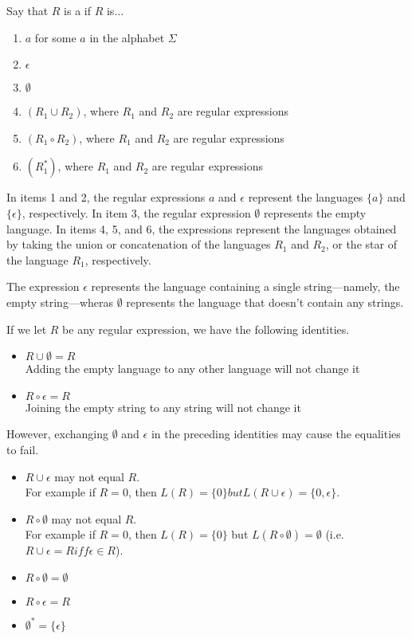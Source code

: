 \documentclass{article}
\begin{document}
\begin{definition}
  Say that $R$ is a  if $R$ is$\dots$ 
  \begin{enumerate}
    \item $a$ for some $a$ in the alphabet $\Sigma$ 
    \item $\epsilon$ 
    \item $\emptyset$ 
    \item $(R_1 \cup R_2)$, where $R_1$ and $R_2$ are regular expressions 
    \item $(R_1 \circ R_2)$, where $R_1$ and $R_2$ are regular expressions 
    \item $(R_{1}^{*})$, where $R_1$ and $R_2$ are regular expressions 
  \end{enumerate}
  In items 1 and 2, the regular expressions $a$ and $\epsilon$ represent the languages $\{a\}$ and $\{\epsilon \}$, respectively. In item 3, the regular expression $\emptyset$ represents the empty language. In items 4, 5, and 6, the expressions represent the languages obtained by taking the union or concatenation of the languages $R_1$ and $R_2$, or the star of the language $R_1$, respectively.  
\end{definition}

\begin{remark}
  The expression $\epsilon$ represents the language containing a single string---namely, the empty string---wheras $\emptyset$ represents the language that doesn't contain any strings. 
\end{remark}

\begin{remark}
  If we let $R$ be any regular expression, we have the following identities. 
  \begin{itemize}
    \item $R \cup \emptyset = R$ \\ Adding the empty language to any other language will not change it 
    \item $R \circ \epsilon = R$ \\ Joining the empty string to any string will not change it
  \end{itemize}
  However, exchanging $\emptyset$ and $\epsilon$ in the preceding identities may cause the equalities to fail. 
  \begin{itemize}
    \item $R \cup \epsilon$ may not equal $R$. \\ For example if $R = 0$, then $L(R) = \{0\} but L(R \cup \epsilon) = \{0,\epsilon \}$. 
    \item $R \circ \emptyset$ may not equal $R$. \\ For example if $R = 0$, then $L(R) = \{0\}$ but $L(R \circ \emptyset) = \emptyset$ (i.e. $R \cup \epsilon = R iff \epsilon \in R$). 
    \item $R \circ \emptyset = \emptyset$ 
    \item $R \circ \epsilon = R$ 
    \item $\emptyset^{*} = \{\epsilon\}$ 
  \end{itemize}
\end{remark}
\end{document}
